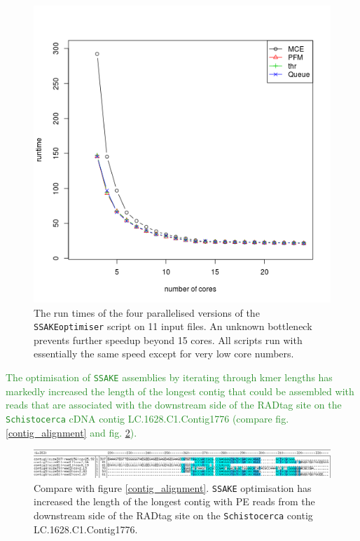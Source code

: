 \documentclass{article}\usepackage[]{graphicx}\usepackage[]{color}
\newcommand{\roger}[1]{ \textcolor[named]{ForestGreen}{#1} }
\begin{document}
\begin{figure}[htb!]
\centering
\includegraphics[width=.9\textwidth]{./figure/SSAKEoptimiser_runtimes}
\caption{The run times of the four parallelised versions of the \texttt{SSAKEoptimiser} script on 11 input files. An unknown bottleneck prevents further speedup beyond 15 cores. All scripts run with essentially the same speed except for very low core numbers.}
\label{runtimes}
\end{figure}

\roger{The optimisation of \texttt{SSAKE} assemblies by iterating through kmer lengths has markedly increased the length of the longest contig that could be assembled with reads that are associated with the downstream side of the RADtag site on the \texttt{Schistocerca} cDNA contig LC.1628.C1.Contig1776 (compare fig. \ref{contig_alignment} and fig. \ref{contig_alignment_opt}).}

\begin{figure}[htb!]
\centering
\includegraphics[width=\textwidth]{./figure/SSAKE_longest_contig}
\caption{Compare with figure \ref{contig_alignment}. \texttt{SSAKE} optimisation has increased the length of the longest contig with PE reads from the downstream side of the RADtag site on the \texttt{Schistocerca} contig LC.1628.C1.Contig1776.}
\label{contig_alignment_opt}
\end{figure}
\end{document}
